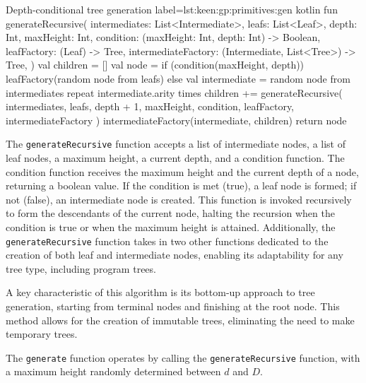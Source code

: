     \begin{code}{Depth-conditional tree generation}{
        label=lst:keen:gp:primitives:gen
    }{kotlin}
        fun generateRecursive(
            intermediates: List<Intermediate>,
            leafs: List<Leaf>,
            depth: Int,
            maxHeight: Int,
            condition: (maxHeight: Int, depth: Int) -> Boolean,
            leafFactory: (Leaf) -> Tree,
            intermediateFactory: (Intermediate, List<Tree>) -> Tree,
        ) {
            val children = []
            val node = if (condition(maxHeight, depth)) {
                leafFactory(random node from leafs)
            } else {
                val intermediate = random node from intermediates
                repeat intermediate.arity times {
                    children += generateRecursive(
                        intermediates,
                        leafs,
                        depth + 1,
                        maxHeight,
                        condition,
                        leafFactory,
                        intermediateFactory
                    )
                }
                intermediateFactory(intermediate, children)
            }
            return node
        }
    \end{code}

    The \texttt{generateRecursive} function accepts a list of intermediate nodes, 
    a list of leaf nodes, a maximum height, a current depth, and a condition 
    function. The condition function receives the maximum height and the current 
    depth of a node, returning a boolean value. If the condition is met (true), a 
    leaf node is formed; if not (false), an intermediate node is created. This 
    function is invoked recursively to form the descendants of the current node, 
    halting the recursion when the condition is true or when the maximum height is 
    attained. Additionally, the \texttt{generateRecursive} function takes in two 
    other functions dedicated to the creation of both leaf and intermediate nodes, 
    enabling its adaptability for any tree type, including program trees.

    A key characteristic of this algorithm is its bottom-up approach to tree generation, starting from terminal nodes and 
    finishing at the root node. This method allows for the creation of immutable trees, eliminating the need to make 
    temporary trees.

    The \texttt{generate} function operates by calling the \texttt{generateRecursive} function, with a maximum height randomly determined between \(d\) and \(D\).

